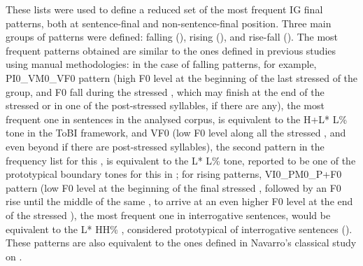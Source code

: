 \documentclass[output=paper]{langsci/langscibook}
\begin{document}
These lists were used to define a reduced set of the most frequent IG final  patterns, both at sentence-final and non-sentence-final position. Three main groups of patterns were defined: falling (), rising (), and rise-fall (). The most frequent patterns obtained are similar to the ones defined in previous studies using manual methodologies: in the case of falling patterns, for example, PI0\_VM0\_VF0 pattern (high F0 level at the beginning of the last stressed  of the  group, and F0 fall during the stressed , which may finish at the end of the stressed  or in one of the post-stressed syllables, if there are any), the most frequent one in  sentences in the analysed corpus, is equivalent to the H+L* L\% tone in the ToBI framework, and VF0 (low F0 level along all the stressed , and even beyond if there are post-stressed syllables), the second pattern in the frequency list for this , is equivalent to the L* L\% tone, reported to be one of the prototypical boundary tones for this  in ; for rising patterns, VI0\_PM0\_P+F0 pattern (low F0 level at the beginning of the final stressed , followed by an F0 rise until the middle of the same , to arrive at an even higher F0 level at the end of the stressed ), the most frequent one in interrogative sentences, would be equivalent to the L* HH\% , considered prototypical of  interrogative sentences (\citealt{EstebasVilaplanaPrieto.2008}). These patterns are also equivalent to the ones defined in Navarro’s classical study on   \citep{NavarroTomas.1944}.
\end{document}
